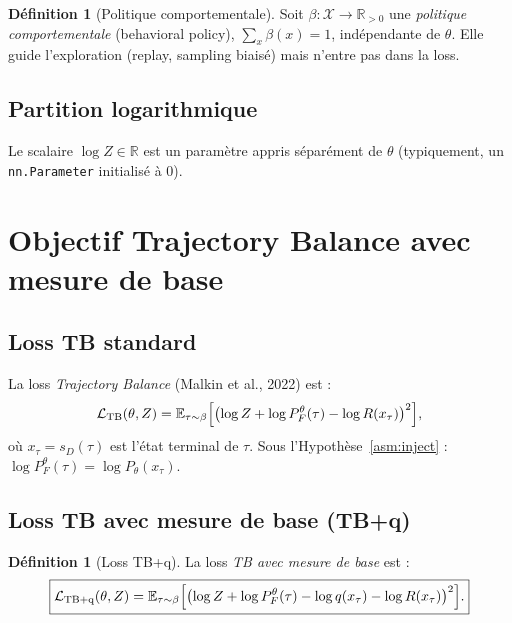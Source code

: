 \documentclass[11pt,a4paper]{article}
\theoremstyle{plain}
\theoremstyle{definition}
\newtheorem{definition}[theorem]{Définition}
\theoremstyle{remark}
\newcommand{\R}{\mathbb{R}}
\newcommand{\E}{\mathbb{E}}
\newcommand{\calX}{\mathcal{X}}
\newcommand{\calL}{\mathcal{L}}
\newcommand{\logZ}{\log Z}
\newcommand{\pF}{P_F}
\newcommand{\pth}{P_\theta}
\begin{document}
\begin{definition}[Politique comportementale]
\label{def:bpol}
Soit $\beta : \calX \to \R_{>0}$ une \emph{politique comportementale} (behavioral policy),
$\sum_x \beta(x) = 1$, indépendante de $\theta$. Elle guide l'exploration (replay,
sampling biaisé) mais n'entre pas dans la loss.
\end{definition}

\subsection{Partition logarithmique}

Le scalaire $\logZ \in \R$ est un paramètre appris séparément de $\theta$
(typiquement, un \texttt{nn.Parameter} initialisé à 0).

\section{Objectif Trajectory Balance avec mesure de base}
\label{sec:objective}

\subsection{Loss TB standard}

La loss \emph{Trajectory Balance} (Malkin et al., 2022) est :
\begin{equation}
  \calL_{\mathrm{TB}}(\theta, Z)
  = \E_{\tau \sim \beta}\Bigl[
      \bigl(\logZ + \log\pF^\theta(\tau) - \log R(x_\tau)\bigr)^2
    \Bigr],
\end{equation}
où $x_\tau = s_D(\tau)$ est l'état terminal de $\tau$.
Sous l'Hypothèse~\ref{asm:inject} :
$\log\pF^\theta(\tau) = \log\pth(x_\tau)$.

\subsection{Loss TB avec mesure de base (TB+q)}

\begin{definition}[Loss TB+q]
\label{def:tbq}
La loss \emph{TB avec mesure de base} est :
\begin{equation}
  \boxed{
  \calL_{\mathrm{TB+q}}(\theta, Z)
  = \E_{\tau \sim \beta}\Bigl[
      \bigl(\logZ + \log\pF^\theta(\tau) - \log q(x_\tau) - \log R(x_\tau)\bigr)^2
    \Bigr].
  }
\end{equation}
\end{definition}
\end{document}
